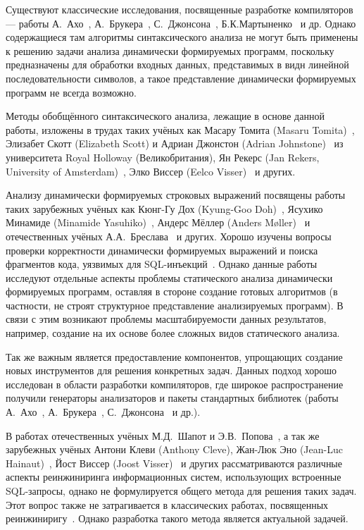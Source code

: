 Существуют классические исследования, посвященные разработке компиляторов --- работы А.~Ахо~\cite{Dragon}, А.~Брукера~\cite{CompilerCompiler}, С.~Джонсона~\cite{yaccBook},  Б.К.Мартыненко~\cite{Martinenko1, Martinenko2}  и др.  Однако содержащиеся там алгоритмы синтаксического анализа не могут быть применены к решению задачи анализа динамически формируемых программ, поскольку предназначены для обработки входных данных, представимых в видн линейной последовательности символов, а такое представление динамически формируемых программ не всегда возможно.

Методы обобщённого синтаксического анализа, лежащие в основе данной работы, изложены в трудах таких учёных как Масару Томита (Masaru Tomita)~\cite{Tomita}, Элизабет Скотт (Elizabeth Scott) и Адриан Джонстон (Adrian Johnstone)~\cite{RNGLR,RIGLR} из университета Royal Holloway (Великобритания), Ян Рекерс (Jan Rekers, University of Amsterdam)~\cite{SPPF}, Элко Виссер (Eelco Visser)~\cite{RNGLRSyntaxerror2,RNGLRSyntaxerror3} и других.

Анализу динамически формируемых строковых выражений посвящены работы таких зарубежных учёных как Кюнг-Гу Дох (Kyung-Goo Doh)~\cite{LrAbstract1,LrAbstract2,LRAbstractParsingSema}, Ясухико Минамиде (Minamide Yasuhiko)~\cite{PHPSA}, Андерс Мёллер (Anders M{\o}ller)~\cite{JSA} и отечественных учёных А.А.~Бреслава~\cite{Alvor1,Alvor2} и других. Хорошо изучены вопросы проверки корректности динамически формируемых выражений и поиска фрагментов кода, уязвимых для SQL-инъекций~\cite{SQLInjection,Dasgupta:2009:SAF:1546683.1547548}. Однако данные работы исследуют отдельные аспекты проблемы статического анализа динамически формируемых программ, оставляя в стороне создание готовых алгоритмов (в частности, не строят структурное представление анализируемых программ). В связи с этим возникают проблемы масштабируемости данных результатов, например, создание на их основе более сложных видов статического анализа.

Так же важным является предоставление компонентов, упрощающих создание новых инструментов для решения конкретных задач. Данных подход хорошо исследован в области разработки компиляторов, где широкое распространение получили генераторы анализаторов и пакеты стандартных библиотек (работы А.~Ахо~\cite{Dragon}, А.~Брукера~\cite{CompilerCompiler}, С.~Джонсона~\cite{yaccBook} и др.). 

В работах отечественных учёных М.Д.~Шапот и Э.В.~Попова~\cite{DynamicDSQLTranslation}, а так же зарубежных учёных Антони Клеви (Anthony Cleve), Жан-Люк Эно (Jean-Luc Hainaut)~\cite{DSQLReverseEngineering}, Йост Виссер (Joost Visser)~\cite{DSQLQualityMesure} и других рассматриваются различные аспекты реинжиниринга информационных систем, использующих встроенные SQL-запросы, однако не формулируется общего метода для решения таких задач. Этот вопрос также не затрагивается в классических работах, посвященных реинжиниригу~\cite{SoftwareReeng1, reengANT, SoftwareReeng2, SoftwareReeng3}. Однако разработка такого метода является актуальной задачей.

